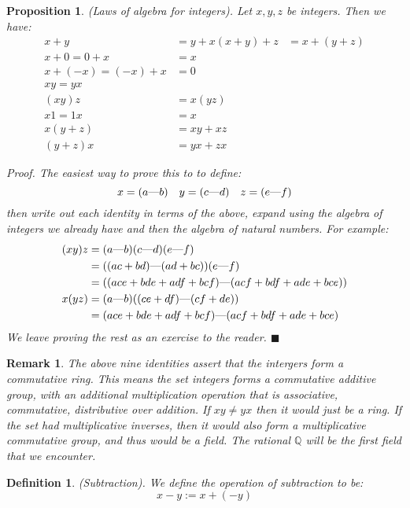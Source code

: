 \documentclass{article}
\newtheorem{definition}{Definition}[subsection]
\newtheorem{remark}{Remark}[subsection]
\newtheorem{proposition}{Proposition}[subsection]
\newcommand{\Q}{\mathbb{Q}}
\newcommand{\mem}{\text{\textemdash}} %
\let\it\textit
\begin{document}
\begin{proposition}
	(Laws of algebra for integers). Let $x,y,z$ be integers. Then 
	we have:
	\begin{align*}
		x + y &= y + x	
		(x+y) + z &= x + (y+z) \\
		x + 0 = 0 + x &= x \\ 
		x + (-x) = (-x) + x &= 0 \\ 
		xy = yx \\ 
		(xy)z &= x(yz) \\ 
		x1 = 1x &= x \\ 
		x(y+z) &= xy + xz \\ 
		(y+z)x &= yx + zx
	\end{align*}

	\it{Proof}. The easiest way to prove this to to define:
	$$
	x = (a \mem b) \quad y = (c \mem d) \quad z = (e \mem f)
	$$
	then write out each identity in terms of the above, expand 
	using the algebra of integers we already have and then 
	the algebra of natural numbers. For example:
	\begin{align*}
		(xy)z &= (a\mem b)(c\mem d)(e\mem f) \\	
		      &= ((ac + bd) \mem (ad + bc)) (e \mem f) \\
		      &= ((ace + bde + adf + bcf) \mem (acf + bdf + ade + bce)) \\
		x(yz) &= (a\mem b)((ce + df) \mem (cf + de)) \\
		      &= (ace + bde + adf + bcf) \mem (acf + bdf + ade + bce)
	\end{align*}
	We leave proving the rest as an exercise to the reader. \hfill $\blacksquare$
\end{proposition}

\begin{remark}
	The above nine identities assert that the intergers form 
	a \it{commutative ring}. This means the set integers forms 
	a commutative additive group, with an additional 
	multiplication operation that is associative, commutative,
	distributive over addition.
	If $xy \neq yx$ then it would just be a ring. If the 
	set had multiplicative inverses, then it would also 
	form a multiplicative commutative group, and thus 
	would be a \it{field}. The rational $\Q$ will be
	the first field that we encounter.
\end{remark}

\begin{definition}
	(Subtraction). We define the operation of subtraction to be: 
	$$
	x - y := x + (-y)
	$$
\end{definition}
\end{document}
